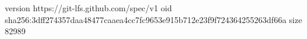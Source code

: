 version https://git-lfs.github.com/spec/v1
oid sha256:3dff274357daa48477caaea4cc7fc9653e915b712e23f9f724364255263df66a
size 82989
